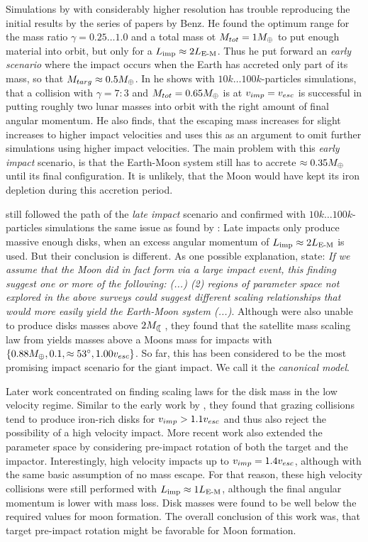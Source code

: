 Simulations by \cite{1997Icar..126..126C} with considerably higher resolution has trouble reproducing the initial results by the series of papers by Benz. He found the optimum range for the mass ratio $\gamma = 0.25 \dots 1.0$ and a total mass ot $M_{tot} = 1 M_{\oplus}$ to put enough material into orbit, but only for a $L_{\textrm{imp}} \approx 2 L_{\textrm{E-M}}$. Thus he put forward an \emph{early scenario} where the impact occurs when the Earth has accreted only part of its mass, so that $M_{targ} \approx 0.5 M_{\oplus}$. In \citep{Cameron:2000p1854} he shows with $10k \dots100k$-particles simulations, that a collision with $\gamma = 7:3$ and $M_{tot} = 0.65 M_{\oplus}$ is at $v_{imp} = v_{esc}$ is successful in putting roughly two lunar masses into orbit with the right amount of final angular momentum. He also finds, that the escaping mass increases for slight increases to higher impact velocities and uses this as an argument to omit further simulations using higher impact velocities. The main problem with this \emph{early impact} scenario, is that the Earth-Moon system still has to accrete $\approx 0.35 M_{\oplus}$ until its final configuration. It is unlikely, that the Moon would have kept its iron depletion during this accretion period.

\cite{Canup:2001p3295} still followed the path of the \emph{late impact} scenario and confirmed with $10k \dots100k$-particles simulations the same issue as found by \citep{Cameron:2000p1854}: Late impacts only produce massive enough disks, when an excess angular momentum of $L_{\textrm{imp}} \approx 2 L_{\textrm{E-M}}$ is used. But their conclusion is different. As one possible explanation, \cite{Canup:2001p3295} state: \emph{If we assume that the Moon did in fact form via a large impact event, this finding suggest one or more of the following: (...) (2) regions of parameter space not explored in the above surveys could suggest different scaling relationships that would more easily yield the Earth-Moon system (...)}. Although \cite{Canup:2001p1861} were also unable to produce disks masses above $2 \ML$, they found that the satellite mass scaling law from  \citep{Kokubo:2000p2195} yields masses above a Moons mass for impacts with $\{0.88 M_{\oplus}, 0.1, \approx 53 ^\circ, 1.00 v_{esc} \}$. So far, this has been considered to be the most promising impact scenario for the giant impact. We call it the \emph{canonical model}.

Later work \citep{Canup:2004p115} concentrated on finding scaling laws for the disk mass in the low velocity regime. Similar to the early work by \cite{Benz:1989p1893}, they found that grazing collisions tend to produce iron-rich disks for $v_{imp} > 1.1 v_{esc}$ and thus also reject the possibility of a high velocity impact. More recent work \citep{Canup:2008p3551} also extended the parameter space by considering pre-impact rotation of both the target and the impactor. Interestingly, high velocity impacts up to $v_{imp} = 1.4 v_{esc}$, although with the same basic assumption of no mass escape. For that reason, these high velocity collisions were still performed with $L_{\textrm{imp}} \approx 1 L_{\textrm{E-M}}$, although the final angular momentum is lower with mass loss. Disk masses were found to be well below the required values for moon formation. The overall conclusion of this work was, that target pre-impact rotation might be favorable for Moon formation.

